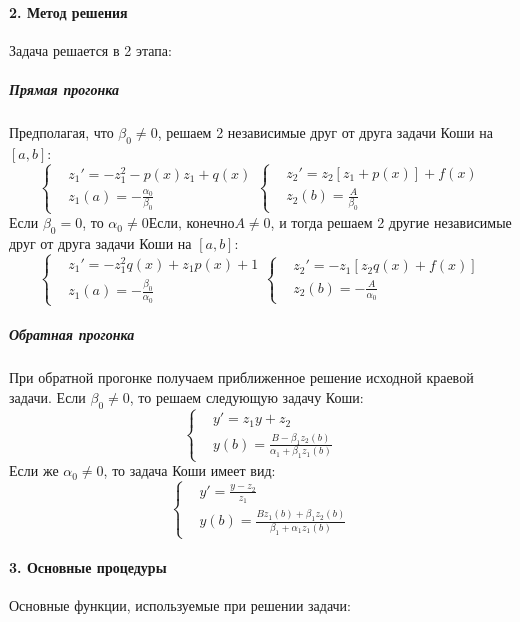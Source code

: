 \documentclass[11pt,a4paper]{report}
\begin{document}
\paragraph{2. Метод решения}
Задача решается в 2 этапа: 
\subparagraph{Прямая прогонка}  Предполагая, что $\beta_0 \neq 0$, решаем 2 независимые друг от друга задачи Коши на $[a,b]$:
\[
	\left\{
		\begin{aligned}
			& z_1' = -z_1^2 - p(x)z_1 + q(x) \\
			& z_1(a) = - \frac{\alpha_0}{\beta_0}
		\end{aligned}
	\right.
	\left\{
		\begin{aligned}
			& z_2' = z_2 [z_1 + p(x)] + f(x) \\
			& z_2(b) = \frac{A}{\beta_0}
		\end{aligned}
	\right.
\]
Если $\beta_0 = 0$, то $\alpha_0 \neq 0 \text{Если, конечно} A \neq 0$, и тогда решаем 2 другие независимые друг от друга задачи Коши на $[a,b]$:
\[
	\left\{
		\begin{aligned}
			& z_1' = -z_1^2q(x) + z_1p(x) + 1 \\
			& z_1(a) = - \frac{\beta_0}{\alpha_0}
		\end{aligned}
	\right.
	\left\{
		\begin{aligned}
			& z_2' = -z_1[z_2q(x) + f(x)] \\
			& z_2(b) = - \frac{A}{\alpha_0}
		\end{aligned}
	\right.
\]
\subparagraph{Обратная прогонка} При обратной прогонке получаем приближенное решение исходной краевой задачи. Если $\beta_0 \neq 0$, то решаем следующую задачу Коши:
\[
	\left\{
		\begin{aligned}
			& y' = z_1y + z_2 \\
			& y(b) = \frac{B - \beta_1z_2(b)}{\alpha_1+\beta_1z_1(b)}
		\end{aligned}
	\right.
\]
Если же $\alpha_0 \neq 0$, то задача Коши имеет вид:
\[
	\left\{
		\begin{aligned}
			& y' = \frac{y - z_2}{z_1} \\
			& y(b) = \frac{Bz_1(b) + \beta_1z_2(b)}{\beta_1+\alpha_1z_1(b)}
		\end{aligned}
	\right.
\]

\paragraph{3. Основные процедуры}
Основные функции, используемые при решении задачи:
\end{document}
